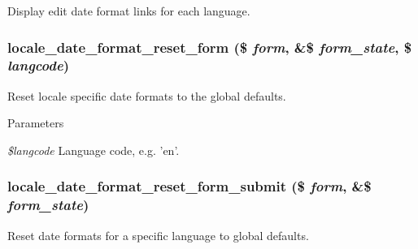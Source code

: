\label{locale_8admin_8inc_a35d0afd550f384a5737479375ba6ada1}
Display edit date format links for each language. \hypertarget{locale_8admin_8inc_aa19c42c04454824ad9f6164ce05c9d31}{
\subsubsection[{locale\_\-date\_\-format\_\-reset\_\-form}]{\setlength{\rightskip}{0pt plus 5cm}locale\_\-date\_\-format\_\-reset\_\-form (\$ {\em form}, \/  \&\$ {\em form\_\-state}, \/  \$ {\em langcode})}}
\label{locale_8admin_8inc_aa19c42c04454824ad9f6164ce05c9d31}
Reset locale specific date formats to the global defaults.


\begin{DoxyParams}{Parameters}
\item[{\em \$langcode}]Language code, e.g. 'en'. \end{DoxyParams}
\hypertarget{locale_8admin_8inc_ab87e0b22dbc23fd80968bcdf7436e565}{
\subsubsection[{locale\_\-date\_\-format\_\-reset\_\-form\_\-submit}]{\setlength{\rightskip}{0pt plus 5cm}locale\_\-date\_\-format\_\-reset\_\-form\_\-submit (\$ {\em form}, \/  \&\$ {\em form\_\-state})}}
\label{locale_8admin_8inc_ab87e0b22dbc23fd80968bcdf7436e565}
Reset date formats for a specific language to global defaults. 